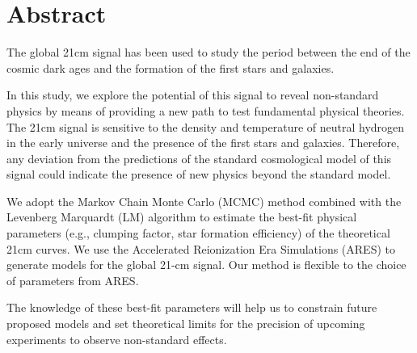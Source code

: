 \documentclass[12pt, TexShade, letterpaper]{report}
\begin{document}
\chapter*{Abstract}
	\label{chap:engAbstract}
The global 21cm signal has been used to study the period between the end of the cosmic dark ages and the formation of the first stars and galaxies. \par
In this study, we explore the potential of this signal to reveal non-standard physics by means of providing a new path to test fundamental physical theories. The 21cm signal is sensitive to the density and temperature of neutral hydrogen in the early universe and the presence of the first stars and galaxies. Therefore, any deviation from the predictions of the standard cosmological model of this signal could indicate the presence of new physics beyond the standard model.\par
We adopt the Markov Chain Monte Carlo (MCMC) method combined with the Levenberg Marquardt (LM) algorithm to estimate the best-fit physical parameters (e.g., clumping factor, star formation efficiency) of the theoretical 21cm curves. We use the Accelerated Reionization Era Simulations (ARES) to generate models for the global 21-cm signal. Our method is flexible to the choice of parameters from ARES.\par
The knowledge of these best-fit parameters will help us to constrain future proposed models and set theoretical limits for the precision of upcoming experiments to observe non-standard effects.\par
\end{document}
